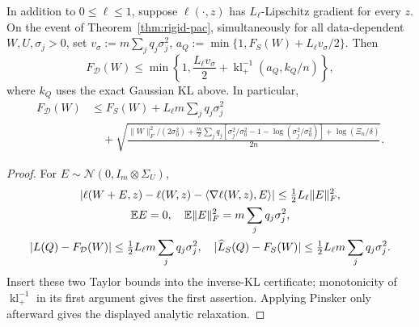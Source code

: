 \begin{corollary}\label{cor:rigid-pac-center}
In addition to $0\le\ell\le1$, suppose $\ell(\cdot,z)$ has
$L_\ell$-Lipschitz gradient for every $z$. On the event of
Theorem~\ref{thm:rigid-pac}, simultaneously for all data-dependent
$W,U,\sigma_j>0$,
set $v_\sigma:=m\sum_jq_j\sigma_j^2$,
$a_Q:=\min\{1,F_S(W)+L_\ell v_\sigma/2\}$. Then
\begin{equation}
 F_\mathcal D(W)\le\min\left\{1,\frac{L_\ell v_\sigma}{2}
           +\operatorname{kl}_+^{-1}(a_Q,k_Q/n)\right\},
\end{equation}
where $k_Q$ uses the exact Gaussian KL above. In particular,
\begin{align}
 F_\mathcal D(W)
 &\le F_S(W)+L_\ell m\sum_jq_j\sigma_j^2\\
 &\quad+\sqrt{\frac{\|W\|_F^2/(2\sigma_0^2)
 +\frac m2\sum_jq_j[\sigma_j^2/\sigma_0^2-1-\log(\sigma_j^2/\sigma_0^2)]
 +\log(\Xi_n/\delta)}{2n}}.
\end{align}
\end{corollary}
\begin{proof}
For $E\sim\mathcal N(0,I_m\otimes\Sigma_U)$,
\begin{gather}
 |\ell(W+E,z)-\ell(W,z)-\langle\nabla\ell(W,z),E\rangle|
                  \le\tfrac12L_\ell\|E\|_F^2,\\
 \mathbb E E=0,\quad\mathbb E\|E\|_F^2=m\sum_jq_j\sigma_j^2,\\
 |L(Q)-F_\mathcal D(W)|\le\tfrac12L_\ell m\sum_jq_j\sigma_j^2,\quad
 |\widehat L_S(Q)-F_S(W)|\le\tfrac12L_\ell m\sum_jq_j\sigma_j^2.
\end{gather}
Insert these two Taylor bounds into the inverse-KL certificate; monotonicity
of $\operatorname{kl}_+^{-1}$ in its first argument gives the first assertion.
Applying Pinsker only afterward gives the displayed analytic relaxation.
\end{proof}
